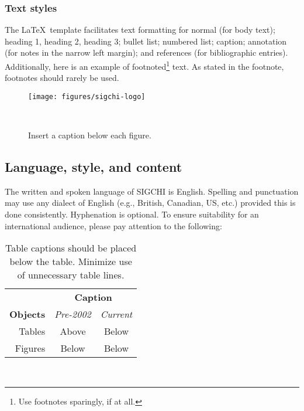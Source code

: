 \documentclass{sigchi-ext}
\begin{document}
    \subsubsection{Text styles}
    The \LaTeX\ template facilitates text formatting for normal (for body
    text); heading 1, heading 2, heading 3; bullet list; numbered list;
    caption; annotation (for notes in the narrow left margin); and
    references (for bibliographic entries). Additionally, here is an
    example of footnoted\footnote{Use footnotes sparingly, if at all.}
    text. As stated in the footnote, footnotes should rarely be used.
    
    \begin{figure}
      \texttt{[image: figures/sigchi-logo]}
      \caption{Insert a caption below each figure.}~\label{fig:sample}
    \end{figure}
    
    \subsection{Language, style, and content}
    The written and spoken language of SIGCHI is English. Spelling and
    punctuation may use any dialect of English (e.g., British, Canadian,
    US, etc.) provided this is done consistently. Hyphenation is
    optional. To ensure suitability for an international audience, please
    pay attention to the following:
    
    \begin{table}
      \centering
      \begin{tabular}{r c c}
        & \multicolumn{2}{c}{\small{\textbf{Caption}}} \\
        \cmidrule(r){2-3}
        {\small\textbf{Objects}}
        & {\small \textit{Pre-2002}}
        & {\small \textit{Current}} \\
        \midrule
        Tables & Above & Below \\
        Figures & Below & Below \\
      \end{tabular}
      \caption{Table captions should be placed below the table. Minimize use of
        unnecessary table lines.}~\label{tab:table1}
    \end{table}
    
\end{document}
